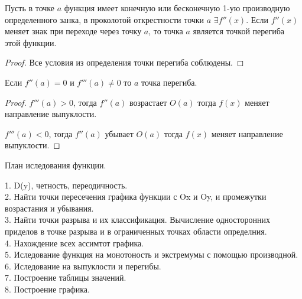 \begin{block}
  Пусть в точке $a$ функция имеет конечную или бесконечную 1-ую производную
  определенного занка, в проколотой открестности точки $a$ $\exists f''(x)$.
  Если $f''(x)$ меняет знак при переходе через точку $a$, то точка $a$ является
  точкой перегиба этой функции.
\end{block}

\begin{proof}
  Все условия из определения точки перегиба соблюдены.
\end{proof}

\begin{theorem}
  Если $f''(a) = 0$ и $f'''(a) \not= 0$ то $a$ точка перегиба.
\end{theorem}

\begin{proof}
  $f'''(a) > 0$, тогда $f''(a)$ возрастает $O(a)$ тогда $f(x)$ меняет
  направление выпуклости.

  $f'''(a) < 0$, тогда $f''(a)$ убывает $O(a)$ тогда $f(x)$ меняет направление
  выпуклости.
\end{proof}

\begin{title}[\Large]
  План иследования функции.
\end{title}
1. D(y), четность, переодичность.\\
2. Найти точки пересечения графика функции с Ox и Oy, и промежутки возрастания
  и убывания.\\
3. Найти точки разрыва и их классификация. Вычисление односторонних приделов
  в точке разрыва и в ограниченных точках области определния.\\
4. Нахождение всех ассимтот графика.\\
5. Иследование функция на монотоность и экстремумы с помощью производной.\\
6. Иследование на выпуклости и перегибы.\\
7. Построение таблицы значений.\\
8. Построение графика.\\